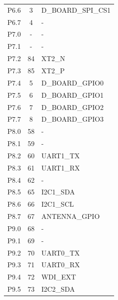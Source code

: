 \begin{longtable}{lcl}
    P6.6              & 3                   & D\_BOARD\_SPI\_CS1    \\
    P6.7              & 4                   & -                     \\
    \midrule
    P7.0              & -                   & -                     \\
    P7.1              & -                   & -                     \\
    P7.2              & 84                  & XT2\_N                \\
    P7.3              & 85                  & XT2\_P                \\
    P7.4              & 5                   & D\_BOARD\_GPIO0       \\
    P7.5              & 6                   & D\_BOARD\_GPIO1       \\
    P7.6              & 7                   & D\_BOARD\_GPIO2       \\
    P7.7              & 8                   & D\_BOARD\_GPIO3       \\
    \midrule
    P8.0              & 58                  & -                     \\
    P8.1              & 59                  & -                     \\
    P8.2              & 60                  & UART1\_TX             \\
    P8.3              & 61                  & UART1\_RX             \\
    P8.4              & 62                  & -                     \\
    P8.5              & 65                  & I2C1\_SDA             \\
    P8.6              & 66                  & I2C1\_SCL             \\
    P8.7              & 67                  & ANTENNA\_GPIO         \\
    \midrule
    P9.0              & 68                  & -                     \\
    P9.1              & 69                  & -                     \\
    P9.2              & 70                  & UART0\_TX             \\
    P9.3              & 71                  & UART0\_RX             \\
    P9.4              & 72                  & WDI\_EXT              \\
    P9.5              & 73                  & I2C2\_SDA             \\

\end{longtable}

